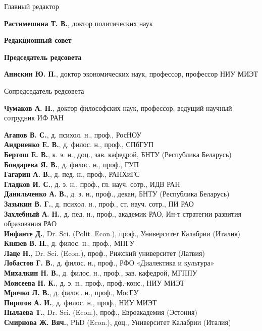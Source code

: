 \pagestyle{empty}


\begin{center}
    Главный редактор

    \textbf{Растимешина Т. В.}, {доктор политических наук}
\end{center}

\noindent
\begin{minipage}[t]{.48\textwidth}
    \begin{flushleft}
        \footnotesize
\textbf{Редакционный совет}

\textbf{Председатель редсовета}

\textbf{Анискин Ю. П.}, доктор экономических наук,
профессор, профессор НИУ МИЭТ

Сопредседатель редсовета

\textbf{Чумаков А. Н.}, доктор философских наук, профессор,
ведущий научный сотрудник ИФ РАН

\textbf{Агапов В. С.}, д. психол. н., проф., РосНОУ\\
\textbf{Андриенко Е. В.}, д. филос. н., проф., СПбГУП\\
\textbf{Бертош Е. В.}, к. э. н., доц., зав. кафедрой, БНТУ
(Республика Беларусь)\\
\textbf{Бондарева Я. В.}, д. филос. н., проф., ГУП\\
\textbf{Гагарин А. В.}, д. пед. н., проф., РАНХиГС\\
\textbf{Гладков И. С.}, д. э. н., проф., гл. науч. сотр., ИДВ РАН\\
\textbf{Данильченко А. В.}, д. э. н., проф., декан, БНТУ
(Республика Беларусь)\\
\textbf{Зазыкин В. Г.}, д. психол. н., проф., ст. науч. сотр.,
ПИ РАО\\
\textbf{Захлебный А. Н.}, д. пед. н., проф., академик РАО,
Ин-т стратегии развития образования РАО\\
\textbf{Инфанте Д.}, Dr. Sci. (Polit. Econ.), проф.,
Университет Калабрии (Италия)\\
\textbf{Князев В. Н.}, д. филос. н., проф., МПГУ\\
\textbf{Лаце Н.}, Dr. Sci. (Econ.), проф.,
Рижский университет (Латвия)\\
\textbf{Лобастов Г. В.}, д. филос. н., проф.,
РФО «Диалектика и культура»\\
\textbf{Михалкин Н. В.}, д. филос. н., проф., зав. кафедрой,
МГППУ\\
\textbf{Моисеева Н. К.}, д. э. н., проф., проф.-конс., НИУ МИЭТ\\
\textbf{Мрочко Л. В.}, д. филос. н., проф., МосГУ\\
\textbf{Пирогов А. И.}, д. филос. н., проф., НИУ МИЭТ\\
\textbf{Пылаева Т.}, Dr. Sci. (Econ.), проф., Евроакадемия
(Эстония)\\
\textbf{Смирнова Ж. Вяч.}, PhD (Econ.), доц.,
Университет Калабрии (Италия)
\end{flushleft}
\end{minipage}\hspace{0.04\textwidth}
